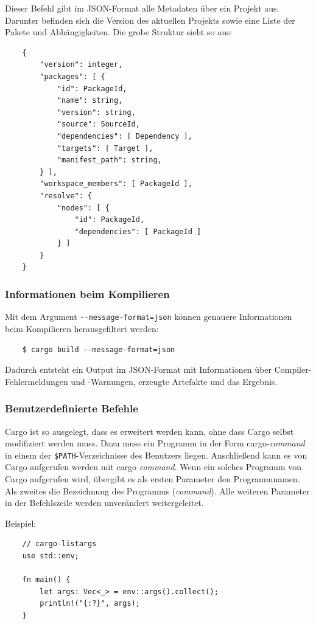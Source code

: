 Dieser Befehl gibt im JSON-Format alle Metadaten über ein Projekt aus. Darunter befinden sich die Version des aktuellen Projekts sowie eine Liste der Pakete und Abhängigkeiten. Die grobe Struktur sieht so aus:

\begin{lstlisting}
    {
        "version": integer,
        "packages": [ {
            "id": PackageId,
            "name": string,
            "version": string,
            "source": SourceId,
            "dependencies": [ Dependency ],
            "targets": [ Target ],
            "manifest_path": string,
        } ],
        "workspace_members": [ PackageId ],
        "resolve": {
            "nodes": [ {
                "id": PackageId,
                "dependencies": [ PackageId ]
            } ]
        }
    }
\end{lstlisting}

\subsubsection{Informationen beim Kompilieren}

Mit dem Argument \verb"--message-format=json" können genauere Informationen beim Kompilieren herausgefiltert werden:

\begin{lstlisting}
    $ cargo build --message-format=json
\end{lstlisting}

Dadurch entsteht ein Output im JSON-Format mit Informationen über Compiler-Fehlermeldungen und -Warnungen, erzeugte Artefakte und das Ergebnis.

\subsubsection{Benutzerdefinierte Befehle}

Cargo ist so ausgelegt, dass es erweitert werden kann, ohne dass Cargo selbst modifiziert werden muss. Dazu muss ein Programm in der Form cargo-\textit{command} in einem der \verb"$PATH"-Verzeichnisse des Benutzers liegen. Anschließend kann es von Cargo aufgerufen werden mit \glqq cargo \textit{command}\grqq{}. Wenn ein solches Programm von Cargo aufgerufen wird, übergibt es als ersten Parameter den Programmnamen. Als zweites die Bezeichnung des Programms (\textit{command}). Alle weiteren Parameter in der Befehlszeile werden unverändert weitergeleitet.

Beispiel:

\begin{lstlisting}
    // cargo-listargs
    use std::env;

    fn main() {
        let args: Vec<_> = env::args().collect();
        println!("{:?}", args);
    }
\end{lstlisting}


